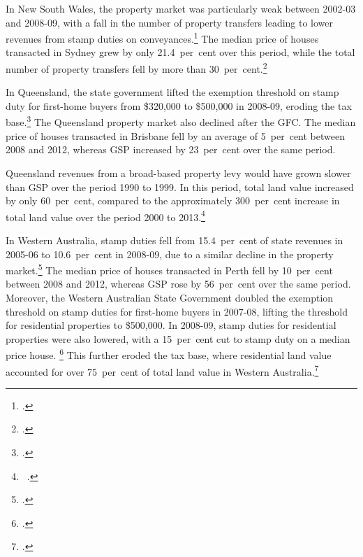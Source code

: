 \documentclass[twoside,english]{palatinob5ona4portrait}
\begin{document}
\begin{subappendices}
In New South Wales, the property market was particularly weak between 2002-03 and  2008-09, with a fall in the number of property transfers leading to lower revenues from stamp duties on conveyances.\footcite[][18]{CGC2009a}  The median price of houses transacted in Sydney grew by only 21.4~per~cent over this period, while the total number of property transfers fell by more than 30~per~cent.\footcite{ABS2015ResidentialPropertyIndex}  

In Queensland, the state government lifted the exemption threshold on stamp duty for first-home buyers from \$320,000 to \$500,000 in 2008-09, eroding the tax base.\footcite{TreasuryTradeQld2012}  The Queensland property market also declined after the GFC. The median price of houses transacted in Brisbane fell by an average of 5~per~cent between 2008 and 2012, whereas GSP increased by 23~per~cent over the same period.  

Queensland revenues from a broad-based property levy would have grown slower than GSP over the period 1990 to 1999. In this period, total land value increased by only 60~per~cent, compared to the approximately 300~per~cent increase in total land value over the period 2000 to 2013.\footnote{\gao\ \textcite{ABS2014e}.}

In Western Australia, stamp duties fell from 15.4~per~cent of state revenues in 2005-06 to 10.6~per~cent in 2008-09, due to a similar decline in the property market.\footcite[][13]{CGC2010b}   The median price of houses transacted in Perth fell by 10~per~cent between 2008 and 2012, whereas GSP rose by 56~per~cent over the same period. Moreover, the Western Australian State Government doubled the exemption threshold on stamp duties for first-home buyers in 2007-08, lifting the threshold for residential properties to \$500,000.  In 2008-09, stamp duties for residential properties were also lowered, with a 15~per~cent cut to stamp duty on a median price house. \footcite{Treasury2007a}   This further eroded the tax base, where residential land value accounted for over 75~per~cent of total land value in Western Australia.\footcite{Treasury2008a}

\cleardoubleevenstandardpage
\newcommand{\propPhantomNotes}{
{\color{white}
\notes{‘Property levy’ shows the revenues that would have been raised with a broad-based property levy of 0.2~per~cent applied to unimproved land values had it been in place over the period.}

\source{\textcites{ABSmultipleyears}{ABS2014e}; Grattan analysis.}}
}


\end{subappendices}
\end{document}
